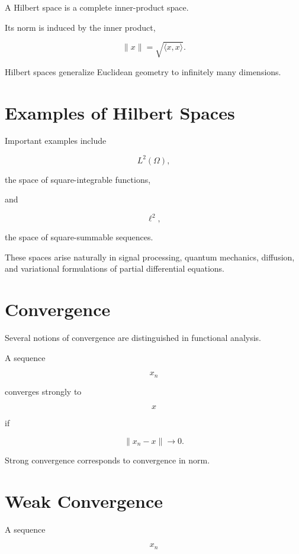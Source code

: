 \documentclass[11pt,fleqn]{book}
\numberwithin{equation}{chapter}
\theoremstyle{plain}
\theoremstyle{definition}
\theoremstyle{remark}
\begin{document}
A Hilbert space is a complete inner-product space.

Its norm is induced by the inner product,

\[
\boxed{
\|x\|
=
\sqrt{\langle x,x\rangle}.
}
\]

Hilbert spaces generalize Euclidean geometry to infinitely many
dimensions.


\section{Examples of Hilbert Spaces}

Important examples include

\[
L^2(\Omega),
\]

the space of square-integrable functions,

and

\[
\ell^2,
\]

the space of square-summable sequences.

These spaces arise naturally in signal processing,
quantum mechanics,
diffusion,
and variational formulations of partial differential equations.


\section{Convergence}

Several notions of convergence are distinguished in functional
analysis.

A sequence

\[
x_n
\]

converges strongly to

\[
x
\]

if

\[
\boxed{
\|x_n-x\|
\rightarrow
0.
}
\]

Strong convergence corresponds to convergence in norm.


\section{Weak Convergence}

A sequence

\[
x_n
\]
\end{document}
